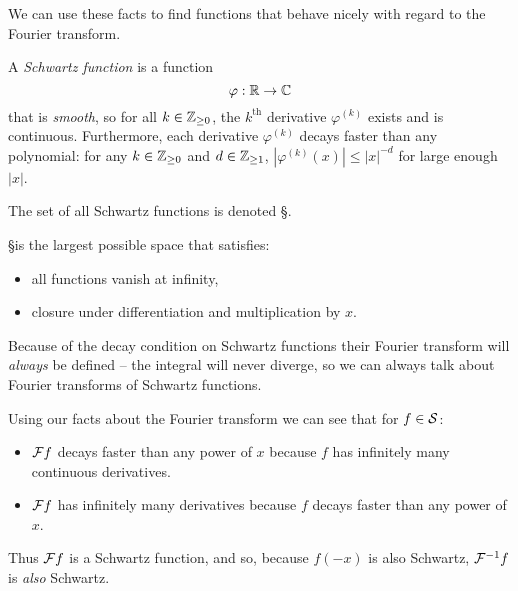     We can use these facts to find functions that behave nicely with regard to the Fourier transform.
    \begin{defn}
      A \emph{Schwartz function} is a function
      \begin{equation*}
        \varphi:\R\rightarrow\C
      \end{equation*}
      that is \emph{smooth}, so for all $k\in\Z_{\ge0}$, the $k^\text{th}$ derivative $\varphi^{(k)}$ exists and is continuous.
      Furthermore, each derivative $\varphi^{(k)}$ decays faster than any polynomial: for any $k\in\Z_{\ge0}$ and $d\in\Z_{\ge1}$, $|\varphi^{(k)}(x)|\le|x|^{-d}$ for large enough $|x|$.

      The set of all Schwartz functions is denoted \S.

      \S is the largest possible space that satisfies:
      \begin{itemize}
        \item all functions vanish at infinity,
        \item closure under differentiation and multiplication by $x$.
      \end{itemize}
    \end{defn}
    Because of the decay condition on Schwartz functions their Fourier transform will \emph{always} be defined -- the integral will never diverge, so we can always talk about Fourier transforms of Schwartz functions.

    Using our facts about the Fourier transform we can see that for $f\in\S$:
    \begin{itemize}
      \item $\F f$ decays faster than any power of $x$ because $f$ has infinitely many continuous derivatives.
      \item $\F f$ has infinitely many derivatives because $f$ decays faster than any power of $x$.
    \end{itemize}
    Thus $\F f$ is a Schwartz function, and so, because $f(-x)$ is also Schwartz, $\F^{-1}f$ is \emph{also} Schwartz.

